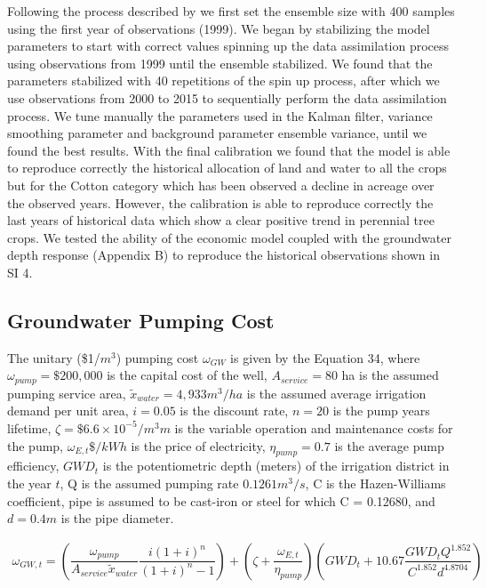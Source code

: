 \documentclass[11pt,a4paper]{article}
\begin{document}
Following the process described by \textcite{maneta_satellite-driven_2020} we first set the ensemble size with 400 samples using the first year of observations (1999). We began by stabilizing the model parameters to start with correct values spinning up the data assimilation process using observations from 1999 until the ensemble stabilized. We found that the parameters stabilized with 40 repetitions of the spin up process, after which we use observations from 2000 to 2015 to sequentially perform the data assimilation process. We tune manually the parameters used in the Kalman filter,  variance smoothing parameter and  background parameter ensemble variance, until we found the best results. With the final calibration we found that the model is able to reproduce correctly the historical allocation of land and water to all the crops but for the Cotton category which has been observed a decline in acreage over the observed years. However, the calibration is able to reproduce correctly the last years of historical data which show a clear positive trend in perennial tree crops. We tested the ability of the economic model coupled with the groundwater depth response (Appendix B) to reproduce the historical observations shown in SI 4.   

\subsection{Groundwater Pumping Cost}

The unitary (\$1/$m^3$) pumping cost $\omega_{GW}$ is given by the Equation 34, where $\omega_{pump}= \$200,000$ is the capital cost of the well, $A_{service}=80$ ha is the assumed pumping service area, $\widetilde{x}_{water}=4,933 m^3/ ha$ is the assumed average irrigation demand per unit area, $i=0.05$ is the discount rate, $n=20$ is the pump years lifetime, $\zeta= \$6.6\times10^{-5} /m^3 m$ is the variable operation and maintenance costs for the pump, $\omega_{E,t} \$/kWh$ is the price of electricity, $\eta_{pump}=0.7$ is the average pump efficiency, $GWD_t$ is the potentiometric depth (meters) of the irrigation district in the year $t$, Q is the assumed pumping rate $0.1261 m^3/s$, C is the Hazen-Williams coefficient, pipe is assumed to be cast-iron or steel for which C = 0.12680, and $d=0.4 m$ is the pipe diameter.

\begin{equation}
\begin{gathered}
\omega_{GW,t} = \left( \dfrac{\omega_{pump}}{A_{service} \widetilde{x}_{water}} \dfrac{i(1+i)^n}{(1+i)^n-1}\right) 
+ \left(\zeta+\dfrac{\omega_{E,t}}{\eta_{pump}} \right) \left(GWD_t +10.67  \dfrac{GWD_t Q^{1.852}}{C^{1.852} d^{4.8704}}\right)
\end{gathered}
\end{equation}            
\end{document}
